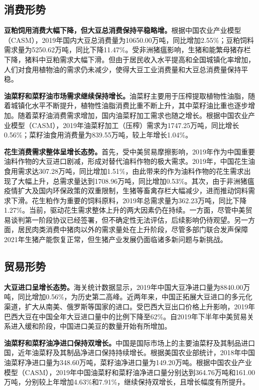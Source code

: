 \documentclass{progbookcn}
\begin{document}
\subsection{消费形势}

\textbf{豆粕饲用消费大幅下降，但大豆总消费保持平稳略增。}根据中国农业产业模型（CASM），2019年国内大豆总消费量为10650.00万吨，同比增加2.55\%；豆粕饲料需求量为5250.62万吨，同比下降11.47\%。受非洲猪瘟影响，生猪和能繁母猪存栏下降，猪料中豆粕需求大幅下滑。但由于居民收入水平提高和全国城镇化率增加，人们对食用植物油的需求仍未减少，使得大豆工业消费量和大豆总消费量保持平稳。

\textbf{油菜籽和菜籽油市场需求继续保持增长。}油菜籽主要用于压榨提取植物性油脂，随着城镇化水平不断提升，植物性油脂消费比重不断上升，其中菜籽油比重也逐步增加。随着菜籽油消费需求增加，国内油菜籽加工需求也随之增长。根据中国农业产业模型（CASM），2019年油菜籽加工（压榨）需求为1747.25万吨，同比增长0.56\%；菜籽油食用消费量为839.55万吨，较上年增长1.04\%。

\textbf{花生消费需求整体呈增长态势。}首先，受中美贸易摩擦影响，2019年作为中国重要油料作物的大豆进口剧减，形成对替代油料作物的极大需求。2019年，中国花生油食用需求达307.28万吨，同比增加1.51\%，由此带来的作为油料作物的花生需求出现了大幅上升，总需求量达到1708.96万吨，同比增加0.53\%。其次，由于非洲猪瘟疫情扩大及国内环保政策的双重限制，生猪等畜禽存栏大幅减少，进而推动饲料需求下滑。花生粕作为重要的饲料原料，2019年总需求量为362.23万吨，同比下降1.27\%。当前，驱动花生需求整体上升的两大因素仍在持续。一方面，尽管中美贸易谈判第一阶段协议已经签署，但不确定性无法评估，后续影响仍待观望。另一方面，居民肉类消费中猪肉以外的需求量处在上升阶段，尽管多部门联合发声保障2021年生猪产能恢复正常，但生猪产业发展仍面临诸多新问题与新挑战。

\subsection{贸易形势}
\textbf{大豆进口呈增长态势。}海关统计数据显示，2019年中国大豆净进口量为8840.00万吨，同比增加0.56\%，为历史第二高峰。近两年来，中国正拓展大豆进口的多元化渠道，扩大从南美、俄罗斯等国家的进口。受巴西大豆出口价格上升影响，2019年巴西大豆在中国全年大豆进口量中的比例下降至62\%。自2019年下半年中美贸易关系进入缓和阶段，中国进口美豆的数量开始有所增加。

\textbf{油菜籽和菜籽油净进口保持双增长。}中国是国际市场上的主要油菜籽及其制品进口国，近年油菜籽及其制品净进口保持持续增长。根据美国农业部统计，2018年中国油菜籽净进口量为348.60万吨，菜籽油净进口量为149.20万吨。根据中国农业产业模型（CASM），2019年中国油菜籽和菜籽油净进口量分别达到364.76万吨和161.00万吨，分别较上年增加4.63\%和7.91\%，继续保持双增长，且增长幅度有所提升。
\end{document}
